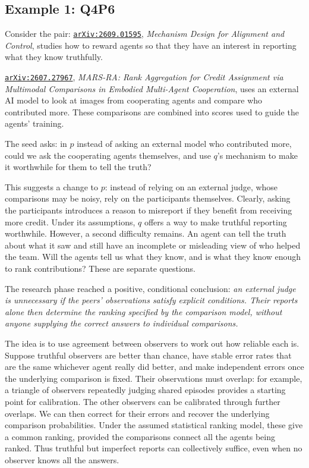 \documentclass[11pt,a4paper]{article}
\renewenvironment{quote}{\tcolorbox[pairpanel]}{\endtcolorbox}
\newcommand{\pl}[1]{\noindent\llap{\makebox[1.5em][l]{\color{accent}\(#1\)}}}
\newcommand{\file}[1]{\texttt{#1}}
\begin{document}
\subsection{Example 1: Q4P6} %
Consider the pair:
\begin{quote}
\pl{q}\href{https://arxiv.org/abs/2609.01595}{\file{arXiv:2609.01595}},
\emph{Mechanism Design for Alignment and Control}, studies how to reward agents
so that they have an interest in reporting what they know truthfully.

\pl{p}\href{https://arxiv.org/abs/2607.27967}{\file{arXiv:2607.27967}},
\emph{MARS-RA: Rank Aggregation for Credit Assignment via Multimodal Comparisons
in Embodied Multi-Agent Cooperation}, uses an external AI model to look at
images from cooperating agents and compare who contributed more. These
comparisons are combined into scores used to guide the agents' training.


The seed asks: in $p$ instead of asking an external model who contributed more,
could we ask the cooperating agents themselves, and use $q$'s mechanism to make
it worthwhile for them to tell the truth?
\end{quote}

This suggests a change to \(p\): instead of relying on an external judge, whose
comparisons may be noisy, rely on the participants themselves. Clearly, asking
the participants introduces a reason to misreport if they benefit from receiving
more credit. Under its assumptions, \(q\) offers a way to make truthful
reporting worthwhile. However, a second difficulty remains. An agent can tell
the truth about what it saw and still have an incomplete or misleading view of
who helped the team. Will the agents tell us what they know, and is what they
know enough to rank contributions? These are separate questions.

The research phase reached a positive, conditional conclusion: \emph{an external
judge is unnecessary if the peers' observations satisfy explicit conditions.
Their reports alone then determine the ranking specified by the comparison
model, without anyone supplying the correct answers to individual comparisons.}

The idea is to use agreement between observers to work out how reliable each is.
Suppose truthful observers are better than chance, have stable error rates that
are the same whichever agent really did better, and make independent errors once
the underlying comparison is fixed. Their observations must overlap: for
example, a triangle of observers repeatedly judging shared episodes provides a
starting point for calibration. The other observers can be calibrated through
further overlaps. We can then correct for their errors and recover the
underlying comparison probabilities. Under the assumed statistical ranking
model, these give a common ranking, provided the comparisons connect all the
agents being ranked. Thus truthful but imperfect reports can collectively
suffice, even when no observer knows all the answers.
\end{document}

